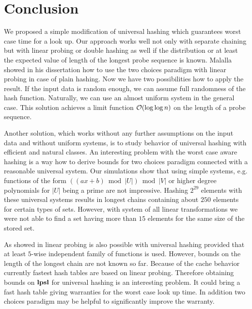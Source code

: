 \section{Conclusion}
\label{section-conclusion}
We proposed a simple modification of universal hashing which guarantees worst case time for a look up. Our approach works well not only with separate chaining but with linear probing or double hashing as well if the distribution or at least the expected value of length of the longest probe sequence is known. Malalla showed in his dissertation \cite{Malalla:2004:THS:1124034} how to use the two choices paradigm with linear probing in case of plain hashing. Now we have two possibilities how to apply the result. If the input data is random enough, we can assume full randomness of the hash function. Naturally, we can use an almost uniform system in the general case. This solution achieves a limit function $\mathcal{O}(\log \log n)$ on the length of a probe sequence.

Another solution, which works without any further assumptions on the input data and without uniform systems, is to study behavior of universal hashing with efficient and natural classes. An interesting problem with the worst case aware hashing is a way how to derive bounds for two choices paradigm connected with a reasonable universal system. Our simulations show that using simple systems, e.g. functions of the form $((ax + b) \bmod |U|) \bmod |V|$ or higher degree polynomials for $|U|$ being a prime are not impressive. Hashing $2^{29}$ elements with these universal systems results in longest chains containing about $250$ elements for certain types of sets. However, with system of all linear transformations we were not able to find a set having more than $15$ elements for the same size of the stored set.

As showed in \cite{DBLP:conf/alenex/ThorupZ10} linear probing is also possible with universal hashing provided that at least $5$-wise independent family of functions is used. However, bounds on the length of the longest chain are not known so far. Because of the cache behavior currently fastest hash tables are based on linear probing. Therefore obtaining bounds on $\mathbf{lpsl}$ for universal hashing is an interesting problem. It could bring a fast hash table giving warranties for the worst case look up time. In addition two choices paradigm may be helpful to significantly improve the warranty.